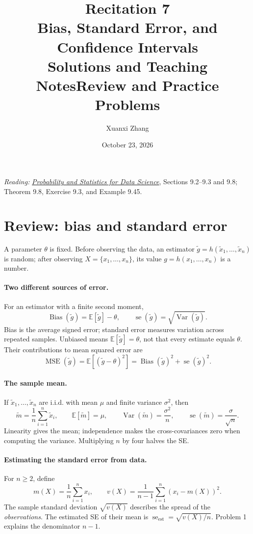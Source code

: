 \documentclass[11pt]{article}
\title{\huge Recitation 7\\[0.35em]
  \normalsize Bias, Standard Error, and Confidence Intervals\\[0.35em]
  \large\ifsolutions Solutions and Teaching Notes\else Review and Practice Problems\fi}
\author{Xuanxi Zhang}
\date{October 23, 2026}
\newcommand{\E}{\mathbb{E}}
\newcommand{\Var}{\operatorname{Var}}
\newcommand{\Bias}{\operatorname{Bias}}
\newcommand{\MSE}{\operatorname{MSE}}
\newcommand{\se}{\operatorname{se}}
\newcommand{\rv}[1]{\widetilde{#1}}
\begin{document}
\maketitle
\noindent\textit{Reading:}
\href{https://github.com/cfgranda/ps4ds/blob/main/ps4ds_preprint.pdf}
{\emph{Probability and Statistics for Data Science}},
Sections 9.2--9.3 and 9.8; Theorem 9.8, Exercise 9.3, and Example 9.45.

\section{Review: bias and standard error}
A parameter $\theta$ is fixed. Before observing the data, an estimator
$\rv{g}=h(\rv{x}_1,\ldots,\rv{x}_n)$ is random; after observing
$X=\{x_1,\ldots,x_n\}$, its value $g=h(x_1,\ldots,x_n)$ is a number.

\paragraph{Two different sources of error.}
For an estimator with a finite second moment,
\[
  \boxed{\Bias(\rv{g})=\E[\rv{g}]-\theta,\qquad
    \se(\rv{g})=\sqrt{\Var(\rv{g})}.}
\]
Bias is the average signed error; standard error measures variation across
repeated samples. Unbiased means $\E[\rv{g}]=\theta$, not that every
estimate equals $\theta$. Their contributions to mean squared error are
\[
  \MSE(\rv{g})=\E[(\rv{g}-\theta)^2]
    =\Bias(\rv{g})^2+\se(\rv{g})^2.
\]

\paragraph{The sample mean.}
If $\rv{x}_1,\ldots,\rv{x}_n$ are i.i.d. with mean $\mu$ and finite
variance $\sigma^2$, then
\[
  \rv{m}=\frac1n\sum_{i=1}^n\rv{x}_i,\qquad
  \E[\rv{m}]=\mu,\qquad
  \Var(\rv{m})=\frac{\sigma^2}{n},\qquad
  \se(\rv{m})=\frac{\sigma}{\sqrt n}.
\]
Linearity gives the mean; independence makes the cross-covariances zero
when computing the variance. Multiplying $n$ by four halves the SE.

\paragraph{Estimating the standard error from data.}
For $n\geq2$, define
\[
  m(X)=\frac1n\sum_{i=1}^n x_i,\qquad
  v(X)=\frac1{n-1}\sum_{i=1}^n(x_i-m(X))^2.
\]
The sample standard deviation $\sqrt{v(X)}$ describes the spread of the
\emph{observations}. The estimated SE of their mean is
$\se_{\mathrm{est}}=\sqrt{v(X)/n}$.
Problem 1 explains the denominator $n-1$.
\end{document}
